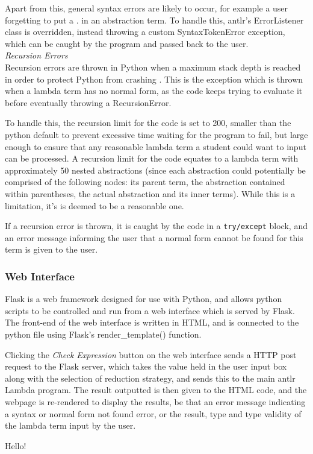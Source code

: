 \documentclass[a4paper,12pt]{report}
\begin{document}
Apart from this, general syntax errors are likely to occur, for example a user forgetting to put a . in an abstraction term. To handle this, antlr's ErrorListener class is overridden, instead throwing a custom SyntaxTokenError exception, which can be caught by the program and passed back to the user.\\

\textit{Recursion Errors}\\
Recursion errors are thrown in Python when a maximum stack depth is reached in order to protect Python from crashing \cite{PythonStack2019}. This is the exception which is thrown when a lambda term has no normal form, as the code keeps trying to evaluate it before eventually throwing a RecursionError.

To handle this, the recursion limit for the code is set to 200, smaller than the python default to prevent excessive time waiting for the program to fail, but large enough to ensure that any reasonable lambda term a student could want to input can be processed. A recursion limit for the code equates to a lambda term with approximately 50 nested abstractions (since each abstraction could potentially be comprised of the following nodes: its parent term, the abstraction contained within parentheses, the actual abstraction and its inner terms). While this is a limitation, it's is deemed to be a reasonable one.

If a recursion error is thrown, it is caught by the code in a \texttt{try/except} block, and an error message informing the user that a normal form cannot be found for this term is given to the user.

\subsubsection{Web Interface}

Flask is a web framework designed for use with Python, and allows python scripts to be controlled and run from a web interface which is served by Flask\cite{FullStack2019}. The front-end of the web interface is written in HTML, and is connected to the python file using Flask's render_template() function.

Clicking the \textit{Check Expression} button on the web interface sends a HTTP post request to the Flask server, which takes the value held in the user input box along with the selection of reduction strategy, and sends this to the main antlr Lambda program. The result outputted is then given to the HTML code, and the webpage is re-rendered to display the results, be that an error message indicating a syntax or normal form not found error, or the result, type and type validity of the lambda term input by the user.


\newpage
Hello! \cite{CourseSpecification}
\cite{Tarau2017}
\cite{Acar2008}
\cite{Barendregt2000}
\cite{Bird2009}
\cite{Alonzo1936}
\cite{Gay2019}
\cite{Everett2019}
\cite{Hankin2004}
\cite{Horowitz2013}
\cite{Kamareddine2000}
\cite{Loader1998}
\cite{Parr2012}
\cite{Pierce2002}
\cite{Rojas1998}
\cite{Scott2016}
\cite{Selinger2013}
\cite{Slonneger1995}
\cite{Sookocheff2018Eta}
\cite{Sookocheff2018Evaluation}
\cite{Tomassetti2007}
\cite{Srivastav2017}

\printbibliography
\end{document}

